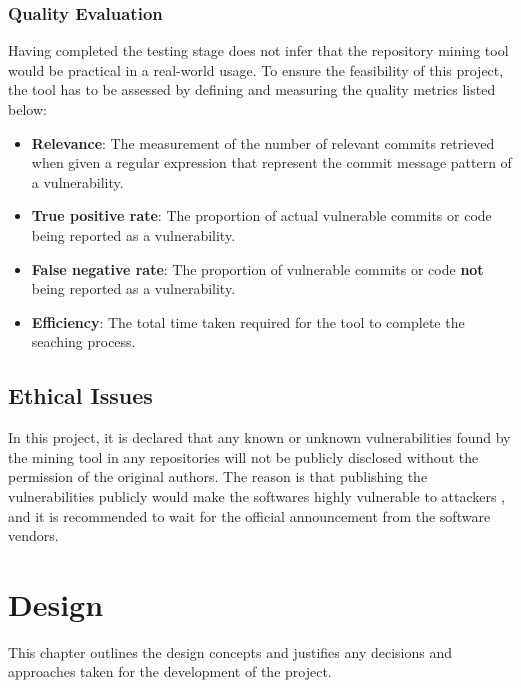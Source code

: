 \documentclass[12pt, a4paper]{report}
\begin{document}
\subsection{Quality Evaluation}
Having completed the testing stage does not infer that the repository mining tool would be practical
in a real-world usage. To ensure the feasibility of this project, the tool has to be assessed by
defining and measuring the quality metrics listed below:

\begin{itemize}
  \item \textbf{Relevance}: The measurement of the number of relevant commits retrieved when given a
  regular expression that represent the commit message pattern of a vulnerability.
  \item \textbf{True positive rate}: The proportion of actual vulnerable commits or code being
  reported as a vulnerability.
  \item \textbf{False negative rate}: The proportion of vulnerable commits or code \textbf{not}
  being reported as a vulnerability.
  \item \textbf{Efficiency}: The total time taken required for the tool to complete the seaching
  process.
\end{itemize}

\section{Ethical Issues}
In this project, it is declared that any known or unknown vulnerabilities found by the mining tool
in any repositories will not be publicly disclosed without the permission of the original authors.
The reason is that publishing the vulnerabilities publicly would make the softwares highly
vulnerable to attackers \cite{arora_2010}, and it is recommended to wait for the official
announcement from the software vendors.

\chapter{Design}
This chapter outlines the design concepts and justifies any decisions and approaches taken for the
development of the project.
\end{document}
